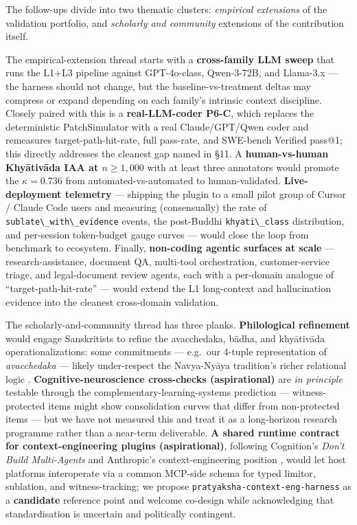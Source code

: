 The follow-ups divide into two thematic clusters: \emph{empirical extensions} of the validation portfolio, and \emph{scholarly and community} extensions of the contribution itself.

The empirical-extension thread starts with a \textbf{cross-family LLM sweep} that runs the L1+L3 pipeline against GPT-4o-class, Qwen-3-72B, and Llama-3.x --- the harness should not change, but the baseline-vs-treatment deltas may compress or expand depending on each family's intrinsic context discipline. Closely paired with this is a \textbf{real-LLM-coder P6-C}, which replaces the deterministic PatchSimulator with a real Claude/GPT/Qwen coder and remeasures target-path-hit-rate, full pass-rate, and SWE-bench Verified pass@1; this directly addresses the cleanest gap named in §11. A \textbf{human-vs-human Khyātivāda IAA at \(n \geq 1{,}000\)} with at least three annotators would promote the \(\kappa = 0.736\) from automated-vs-automated to human-validated. \textbf{Live-deployment telemetry} --- shipping the plugin to a small pilot group of Cursor / Claude Code users and measuring (consensually) the rate of \passthrough{\lstinline!sublate\_with\_evidence!} events, the post-Buddhi \passthrough{\lstinline!khyati\_class!} distribution, and per-session token-budget gauge curves --- would close the loop from benchmark to ecosystem. Finally, \textbf{non-coding agentic surfaces at scale} --- research-assistance, document QA, multi-tool orchestration, customer-service triage, and legal-document review agents, each with a per-domain analogue of ``target-path-hit-rate'' --- would extend the L1 long-context and hallucination evidence into the cleanest cross-domain validation.

The scholarly-and-community thread has three planks. \textbf{Philological refinement} would engage Sanskritists to refine the avacchedaka, bādha, and khyātivāda operationalizations: some commitments --- e.g.~our 4-tuple representation of \emph{avacchedaka} --- likely under-respect the Navya-Nyāya tradition's richer relational logic \citep{matilal1968navyanyaya, ingalls1951materials, gangesa14tattvacintamani}. \textbf{Cognitive-neuroscience cross-checks (aspirational)} are \emph{in principle} testable through the complementary-learning-systems prediction \citep{mcclelland1995cls, kumaran2016cls} --- witness-protected items might show consolidation curves that differ from non-protected items --- but we have not measured this and treat it as a long-horizon research programme rather than a near-term deliverable. \textbf{A shared runtime contract for context-engineering plugins (aspirational)}, following Cognition's \emph{Don't Build Multi-Agents} \citep{yan2025dontbuild} and Anthropic's context-engineering position \citep{anthropic2025contexteng}, would let host platforms interoperate via a common MCP-side schema for typed limitor, sublation, and witness-tracking; we propose \passthrough{\lstinline!pratyaksha-context-eng-harness!} as a \textbf{candidate} reference point and welcome co-design while acknowledging that standardisation is uncertain and politically contingent.

